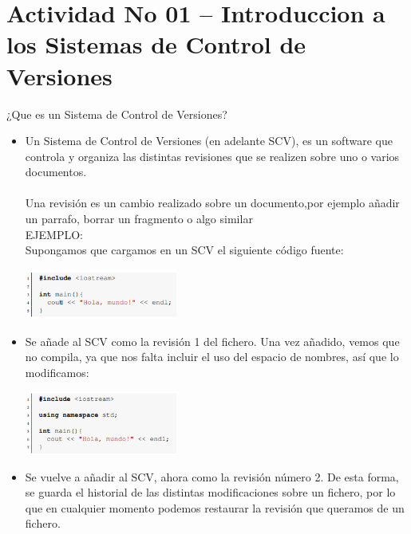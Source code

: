 \section{Actividad No 01 – Introduccion a los Sistemas de Control de Versiones} 
¿Que es un Sistema de Control de Versiones?

\begin{itemize}
	\item Un Sistema de Control de Versiones (en adelante SCV), es un software que controla y organiza las distintas revisiones que se realizen sobre uno o varios documentos.
	\\ \\Una  revisión es un cambio realizado sobre un documento,por ejemplo añadir un parrafo, borrar un fragmento o algo similar
	\\EJEMPLO:
	\\Supongamos que cargamos en un SCV el siguiente código fuente:

	\begin{center}
	\includegraphics[width=5cm]{./Imagenes/imagen01} 
	\end{center}
	
	\item Se añade al SCV como la revisión 1 del fichero. Una vez añadido, vemos que no compila, ya que nos falta incluir el uso del espacio de nombres, así que lo modificamos:
	
	\begin{center}
	\includegraphics[width=5cm]{./Imagenes/imagen02} 
	\end{center}

	\item Se vuelve a añadir al SCV, ahora como la revisión número 2. De esta forma, se guarda el historial de las distintas modificaciones sobre un fichero, por lo que en cualquier momento podemos restaurar la revisión que queramos de un fichero.
	

\end{itemize}